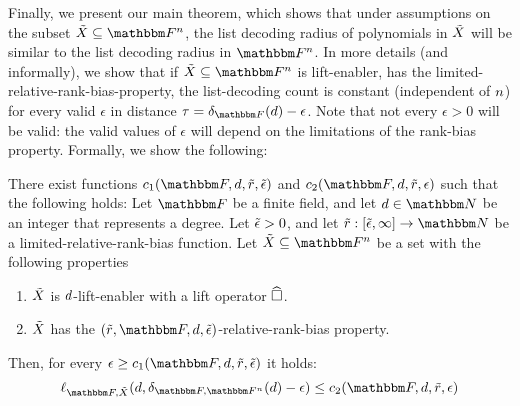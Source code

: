Finally, we present our main theorem, which shows that under assumptions on the subset $\variety \subseteq \field$, the list decoding radius of polynomials in ${\tilde{X}}$ will be similar to the list decoding radius in $\field$.
\newline
In more details (and informally), we show that if $\variety \subseteq \field$ is lift-enabler, has the limited-relative-rank-bias-property,
the list-decoding count is constant (independent of $n$) for every valid $\epsilon$ in distance $\tau = \normalizedcodedistance{\basefield}{\degree} - \epsilon$.
Note that not every $\epsilon > 0$ will be valid: the valid values of $\epsilon$ will depend on the limitations of the rank-bias property.
Formally, we show the following:
\begin{theorem}\label{thm:list-decoding-RM-in-X}
    There exist functions $c_1(\basefield, \degree, \rankbiasfunc, \epsilonlimitedrankbias)$ and $c_2(\basefield, \degree, \rankbiasfunc, \epsilon)$ such that the following holds:
    Let $\basefield$ be a finite field, and let $\degree \in \naturalnumbersset$ be an integer that represents a degree.
    Let ${\tilde{\epsilon}} > 0$, and let $\funcdef{\rankbiasfunc}{[\epsilonlimitedrankbias, \infty]}{\naturalnumbersset}$ be a limited-relative-rank-bias function.
    \newline
    Let $\variety \subseteq \field$ be a set with the following properties
    \begin{enumerate}
        \item ${\tilde{X}}$ is $d$-lift-enabler with a lift operator $\widehat{\square}$.
        \item ${\tilde{X}}$ has the $(\rankbiasfunc, \basefield, \degree, \epsilonlimitedrankbias)$-relative-rank-bias property.
    \end{enumerate}
    Then, for every $\epsilon \geq c_1(\basefield, \degree, \rankbiasfunc, \epsilonlimitedrankbias)$ it holds:
    \[
        \listpolycount{\basefield}{\variety}{\degree}{\normalizedcodedistanceex{\basefield}{\field}{\degree} - \epsilon} \leq
        c_2(\basefield, \degree, \rankbiasfunc, \epsilon)
    \]
\end{theorem}
